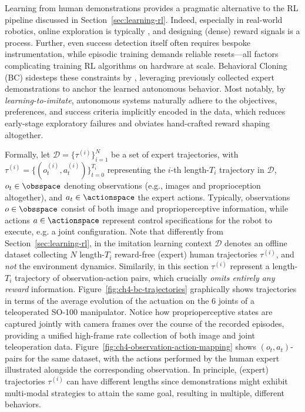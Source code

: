 Learning from human demonstrations provides a pragmatic alternative to the RL pipeline discussed in Section~\ref{sec:learning-rl}.
Indeed, especially in real-world robotics, online exploration is typically , and designing (dense) reward signals is a  process.
Further, even success detection itself often requires bespoke instrumentation, while episodic training demands reliable resets---all factors complicating training RL algorithms on hardware at scale.
Behavioral Cloning (BC) sidesteps these constraints by , leveraging previously collected expert demonstrations to anchor the learned autonomous behavior.
Most notably, by \emph{learning-to-imitate}, autonomous systems naturally adhere to the objectives, preferences, and success criteria implicitly encoded in the data, which reduces early-stage exploratory failures and obviates hand-crafted reward shaping altogether.

Formally, let \( \mathcal D = \{ \tau^{(i)} \}_{i=1}^N \) be a set of expert trajectories, with \( \tau^{(i)} = \{(o_t^{(i)}, a_t^{(i)})\}_{t=0}^{T_i} \) representing the \(i\)-th length-\(T_i\) trajectory in \( \mathcal D \), \(o_t \in \obsspace \) denoting observations (e.g., images and proprioception altogether), and \(a_t \in \actionspace \) the expert actions.
Typically, observations \( o \in \obsspace \) consist of both image and proprioperceptive information, while actions \( a \in \actionspace \) represent control specifications for the robot to execute, e.g. a joint configuration.
Note that differently from Section~\ref{sec:learning-rl}, in the imitation learning context \( \mathcal D \) denotes an offline dataset collecting \( N \) length-\( T_i \) reward-free (expert) human trajectories \( \tau^{(i)} \), and \emph{not} the environment dynamics.
Similarily, in this section \( \tau^{(i)} \) represent a length-\(T_i\) trajectory of observation-action pairs, which crucially \emph{omits entirely any reward} information.
Figure~\ref{fig:ch4-bc-trajectories} graphically shows trajectories in terms of the average evolution of the actuation on the 6 joints of a teleoperated SO-100 manipulator.
Notice how proprioperceptive states are captured jointly with camera frames over the course of the recorded episodes, providing a unified high-frame rate collection of both image and joint teleoperation data.
Figure~\ref{fig:ch4-observation-action-mapping} shows \( (o_t, a_t) \)-pairs for the same dataset, with the actions performed by the human expert illustrated alongside the corresponding observation.
In principle, (expert) trajectories \( \tau^{(i)} \) can have different lengths since demonstrations might exhibit multi-modal strategies to attain the same goal, resulting in multiple, different behaviors.


